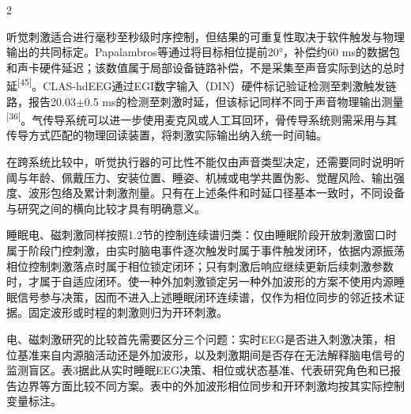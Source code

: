 \documentclass[UTF8,zihao=5,fontset=none]{ctexart}
\newcommand{\hei}{\CJKfamily{hei}}
\newcommand{\leveltwo}[1]{%
  \par\noindent{\hei\fontsize{10.5pt}{12.6pt}\selectfont\mdseries #1\par}}
\newcommand{\refcite}[1]{\nolinebreak[4]\textsuperscript{[#1]}}
\begin{document}
\begin{multicols}{2}

听觉刺激适合进行毫秒至秒级时序控制，但结果的可重复性取决于软件触发与物理输出的共同标定。Papalambros等通过将目标相位提前20°，补偿约60 ms的数据包和声卡硬件延迟；该数值属于局部设备链路补偿，不是采集至声音实际到达的总时延\refcite{45}。CLAS-hdEEG通过EGI数字输入（DIN）硬件标记验证检测至刺激触发链路，报告20.03$\pm$0.5 ms的检测至刺激时延，但该标记同样不同于声音物理输出测量\refcite{36}。气传导系统可以进一步使用麦克风或人工耳回环，骨传导系统则需采用与其传导方式匹配的物理回读装置，将刺激实际输出纳入统一时间轴。\par

在跨系统比较中，听觉执行器的可比性不能仅由声音类型决定，还需要同时说明听阈与年龄、佩戴压力、安装位置、睡姿、机械或电学共置伪影、觉醒风险、输出强度、波形包络及累计刺激剂量。只有在上述条件和时延口径基本一致时，不同设备与研究之间的横向比较才具有明确意义。\par

\leveltwo{5.2 电刺激与磁刺激}

睡眠电、磁刺激同样按照1.2节的控制连续谱归类：仅由睡眠阶段开放刺激窗口时属于阶段门控刺激，由实时脑电事件逐次触发时属于事件触发闭环，依据内源振荡相位控制刺激落点时属于相位锁定闭环；只有刺激后响应继续更新后续刺激参数时，才属于自适应闭环。使一种外加刺激锁定另一种外加波形的方案不使用内源睡眠信号参与决策，因而不进入上述睡眠闭环连续谱，仅作为相位同步的邻近技术证据。固定波形或时程的刺激则归为开环刺激。\par

电、磁刺激研究的比较首先需要区分三个问题：实时EEG是否进入刺激决策，相位基准来自内源脑活动还是外加波形，以及刺激期间是否存在无法解释脑电信号的监测盲区。表3据此从实时睡眠EEG决策、相位或状态基准、代表研究角色和已报告边界等方面比较不同方案。表中的外加波形相位同步和开环刺激均按其实际控制变量标注。\par

\end{multicols}
\end{document}
